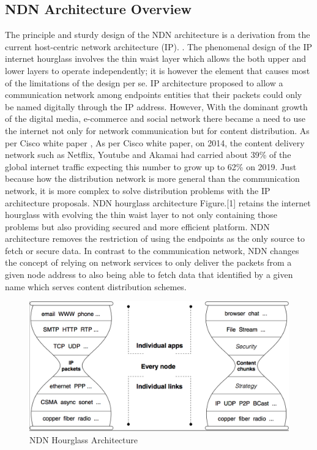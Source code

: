 \documentclass[twocolumn]{article}
\begin{document}
\subsection{NDN Architecture Overview}
The principle and sturdy design of the NDN architecture is a derivation from the current host-centric network architecture (IP). \cite{Pan2011}. The phenomenal design of the IP internet hourglass involves the thin waist layer which allows the both upper and lower layers to operate independently; it is however the element that causes most of the limitations of the design per se. IP architecture proposed to allow a communication network among endpoints entities that their packets could only be named digitally through the IP address. However, With the dominant growth of the digital media, e-commerce and social network there became a need to use the internet not only for network communication but for content distribution. As per Cisco white paper \cite{Cisco2015}, As per Cisco white paper, on 2014, the content delivery network such as Netflix, Youtube and Akamai had carried about 39\% of the global internet traffic expecting this number to grow up to 62\% on 2019. Just because how the distribution network is more general than the communication network, it is more complex to solve distribution problems with the IP architecture proposals. NDN hourglass architecture Figure.[1] retains the internet hourglass with evolving the thin waist layer to not only containing those problems but also providing secured and more efficient platform. NDN architecture removes the restriction of using the endpoints as the only source to fetch or secure data. In contrast to the communication network, NDN changes the concept of relying on network services to only deliver the packets from a given node address to also being able to fetch data that identified by a given name which serves content distribution schemes.
\begin{figure} [h]
    \centering
    \includegraphics[width=\columnwidth]{hourglass.png}
    \caption{\small NDN Hourglass Architecture}
    \label{fig:my_label}
\end{figure}
\end{document}
